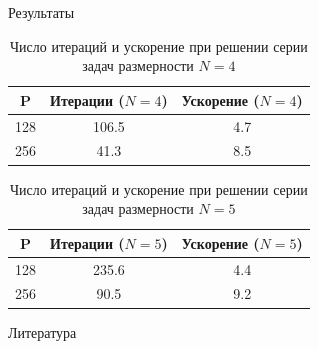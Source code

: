 \documentclass{beamer}
\begin{document}
\begin{frame}[t]
\begin{columns}[t]
\begin{column}[t]{0.48\paperwidth}
\begin{block}{Результаты}
\begin{table}[!hbp]
    \centering
    \caption{Число итераций и ускорение при решении серии задач размерности $N=4$}
    \begin{tabular}{|c|c|c|}
    \hline
    P    & Итерации ($N=4$) & Ускорение ($N=4$) \\ \hline
	128 & 106.5   & 4.7    \\ \hline
	256 & 41.3    & 8.5          \\ \hline
	\end{tabular}
    
    \label{table:GKLS_RES_1}
\end{table}

\begin{table}[!hbp]
    \centering
    \caption{Число итераций и ускорение при решении серии задач размерности $N=5$}
    \begin{tabular}{|c|c|c|}
    \hline
    P    &         Итерации ($N=5$) & Ускорение ($N=5$) \\ \hline
	128 &        235.6   & 4.4      \\ \hline
	256 &       90.5    & 9.2      \\ \hline
	\end{tabular}
    
    \label{table:GKLS_RES_2}
\end{table}
     
\end{block}
          \begin{block}{Литература}
            \printbibliography
            
          \end{block}
        \end{column}
    \end{columns}
\end{frame}
\end{document}
